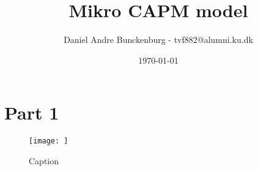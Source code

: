 \documentclass{article}
\title{Mikro CAPM model}
\author{Daniel Andre Bunckenburg - tvf882@alumni.ku.dk}
\date{\today}
\begin{document}
\maketitle
\section*{Part 1}

\begin{figure}
    \centering
    \texttt{[image: ]}
    \caption{Caption}
    \label{fig:enter-label}
\end{figure}
\end{document}
